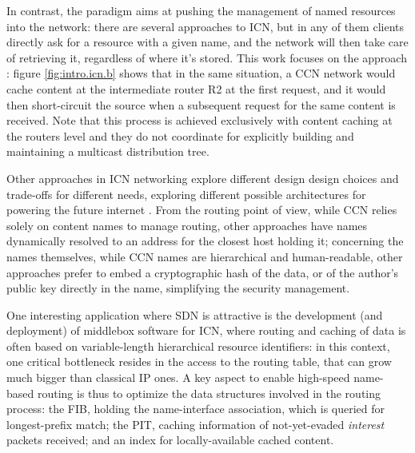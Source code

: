\documentclass[11pt,a4paper,twoside,titlepage,openany]{book}
\begin{document}
In contrast, the  paradigm aims at pushing the management of named resources into the network: there are several approaches to ICN, but in any of them clients directly ask for a resource with a given name, and the network will then take care of retrieving it, regardless of where it's stored.
This work focuses on the  approach \cite{ccn}: figure \ref{fig:intro.icn.b} shows that in the same situation, a CCN network would cache content at the intermediate router R2 at the first request, and it would then short-circuit the source when a subsequent request for the same content is received. Note that this process is achieved exclusively with content caching at the routers level and they do not coordinate for explicitly building and maintaining a multicast distribution tree.

Other approaches in \gls{ICN} networking explore different design design choices and trade-offs for different needs, exploring different possible architectures for powering the future internet \cite{icn-survey}. From the routing point of view, while CCN relies solely on content names to manage routing, other approaches have names dynamically resolved to an address for the closest host holding it; concerning the names themselves, while CCN names are hierarchical and human-readable, other approaches prefer to embed a cryptographic hash of the data, or of the author's public key directly in the name, simplifying the security management.


One interesting application where SDN is attractive is the development (and deployment) of middlebox software for \gls{ICN}, where routing and caching of data is often based on variable-length hierarchical resource identifiers: in this context, one critical bottleneck resides in the access to the routing table, that can grow much bigger than classical IP ones.
A key aspect to enable high-speed name-based routing is thus to optimize the data structures involved in the routing process: the \gls{FIB}, holding the name-interface association, which is queried for longest-prefix match; the \gls{PIT}, caching information of not-yet-evaded \emph{interest} packets received; and an index for locally-available cached content.
\end{document}
